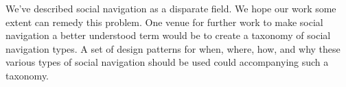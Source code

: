 We've described social navigation as a disparate field. We hope our work
some extent can remedy this problem. One venue for further work to make social
navigation a better understood term would be to create a taxonomy of social
navigation types. A set of design patterns for when, where, how, and why these
various types of social navigation should be used could accompanying such a
taxonomy.


